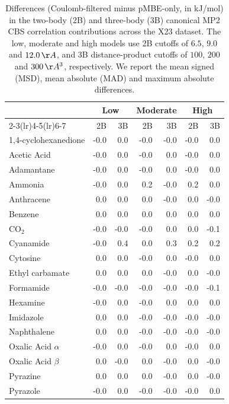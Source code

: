 \begin{table}[h]
\centering

\caption{\label{tab:x23_coulomb_filter_validation_mp2}Differences (Coulomb-filtered minus pMBE-only, in kJ/mol) in the two-body (2B) and three-body (3B) canonical MP2 CBS correlation contributions across the X23 dataset. The low, moderate and high models use 2B cutoffs of $6.5$, $9.0$ and $12.0\,\AA{}$, and 3B distance-product cutoffs of $100$, $200$ and $300\,\AA{}^3$, respectively. We report the mean signed (MSD), mean absolute (MAD) and maximum absolute differences.}
\begin{tabular}{lrrrrrr}
\toprule
 & \multicolumn{2}{c}{Low} & \multicolumn{2}{c}{Moderate} & \multicolumn{2}{c}{High} \\ \cmidrule(lr){2-3}\cmidrule(lr){4-5}\cmidrule(lr){6-7}
 & 2B & 3B & 2B & 3B & 2B & 3B \\
\midrule
1,4-cyclohexanedione & -0.0 & 0.0 & -0.0 & -0.0 & -0.0 & 0.0 \\
Acetic Acid & -0.0 & 0.0 & -0.0 & 0.0 & -0.0 & 0.0 \\
Adamantane & -0.0 & 0.0 & -0.0 & 0.0 & -0.0 & 0.0 \\
Ammonia & -0.0 & 0.0 & 0.2 & -0.0 & 0.2 & 0.0 \\
Anthracene & 0.0 & 0.0 & 0.0 & -0.0 & 0.0 & -0.0 \\
Benzene & 0.0 & 0.0 & 0.0 & 0.0 & 0.0 & 0.0 \\
CO$_2$ & -0.0 & -0.0 & -0.0 & 0.0 & 0.0 & -0.1 \\
Cyanamide & -0.0 & 0.4 & 0.0 & 0.3 & 0.2 & 0.2 \\
Cytosine & 0.0 & 0.0 & -0.0 & 0.0 & -0.0 & 0.0 \\
Ethyl carbamate & 0.0 & 0.0 & 0.0 & -0.0 & 0.0 & -0.0 \\
Formamide & -0.0 & -0.0 & -0.0 & -0.0 & -0.0 & -0.1 \\
Hexamine & -0.0 & 0.0 & -0.0 & 0.0 & 0.0 & 0.0 \\
Imidazole & 0.0 & 0.0 & -0.0 & -0.0 & -0.0 & -0.0 \\
Naphthalene & 0.0 & 0.0 & -0.0 & -0.0 & -0.0 & -0.0 \\
Oxalic Acid $\alpha$ & -0.0 & 0.0 & -0.0 & 0.0 & -0.0 & 0.0 \\
Oxalic Acid $\beta$ & 0.0 & -0.0 & 0.0 & -0.0 & 0.0 & -0.0 \\
Pyrazine & 0.0 & 0.0 & 0.0 & -0.0 & 0.0 & -0.0 \\
Pyrazole & -0.0 & 0.0 & -0.0 & -0.0 & -0.0 & 0.0 \\

\end{tabular}
\end{table}
